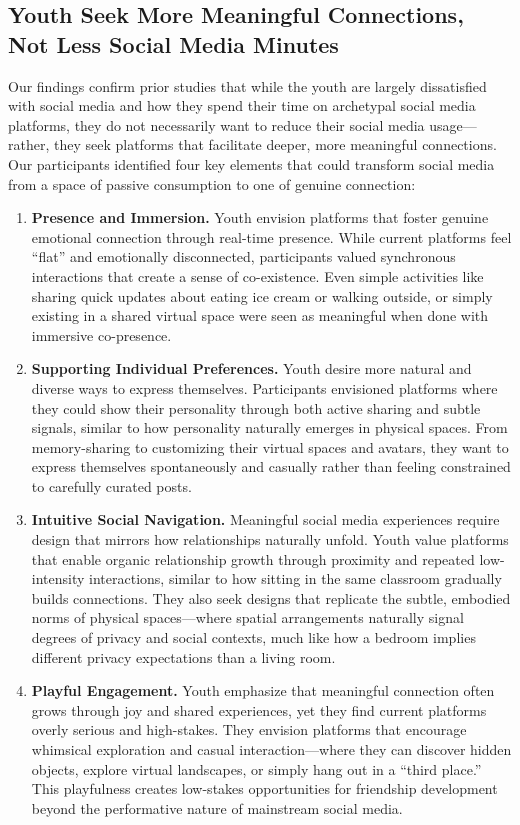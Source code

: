 \subsection{Youth Seek More Meaningful Connections, Not Less Social Media Minutes}
\label{discussion2}
Our findings confirm prior studies that while the youth are largely dissatisfied with social media and how they spend their time on archetypal social media platforms, they do not necessarily want to reduce their social media usage---rather, they seek platforms that facilitate deeper, more meaningful connections. Our participants identified four key elements that could transform social media from a space of passive consumption to one of genuine connection:

\begin{enumerate}
    \item \textbf{Presence and Immersion.} Youth envision platforms that foster genuine emotional connection through real-time presence. While current platforms feel ``flat'' and emotionally disconnected, participants valued synchronous interactions that create a sense of co-existence. Even simple activities like sharing quick updates about eating ice cream or walking outside, or simply existing in a shared virtual space were seen as meaningful when done with immersive co-presence.
    \item \textbf{Supporting Individual Preferences.} Youth desire more natural and diverse ways to express themselves. Participants envisioned platforms where they could show their personality through both active sharing and subtle signals, similar to how personality naturally emerges in physical spaces. From memory-sharing to customizing their virtual spaces and avatars, they want to express themselves spontaneously and casually rather than feeling constrained to carefully curated posts.
    \item \textbf{Intuitive Social Navigation.} Meaningful social media experiences require design that mirrors how relationships naturally unfold. Youth value platforms that enable organic relationship growth through proximity and repeated low-intensity interactions, similar to how sitting in the same classroom gradually builds connections. They also seek designs that replicate the subtle, embodied norms of physical spaces---where spatial arrangements naturally signal degrees of privacy and social contexts, much like how a bedroom implies different privacy expectations than a living room.
    \item \textbf{Playful Engagement.} Youth emphasize that meaningful connection often grows through joy and shared experiences, yet they find current platforms overly serious and high-stakes. They envision platforms that encourage whimsical exploration and casual interaction---where they can discover hidden objects, explore virtual landscapes, or simply hang out in a ``third place.'' This playfulness creates low-stakes opportunities for friendship development beyond the performative nature of mainstream social media.
\end{enumerate}

